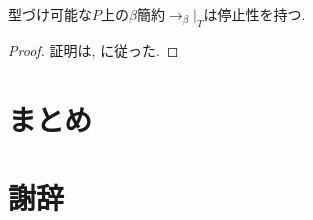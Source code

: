 \documentclass{ltjsarticle}
\begin{document}
\begin{thm}
 型づけ可能な$P$上の$\beta$簡約$\rightarrow_{\beta}|_T$は停止性を持つ.
\end{thm}
\begin{proof}
 証明は\cite{geuvers1994short}, \cite{girard1989proofs}に従った.
\end{proof}


\section{まとめ}

\section{謝辞}



\end{document}
